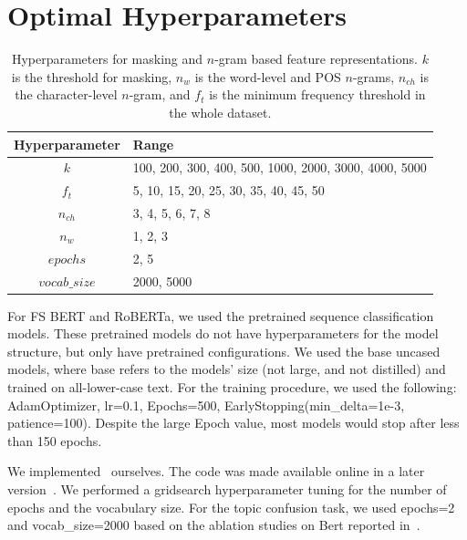 \documentclass[11pt]{article}
\begin{document}
\newpage
\section{Optimal Hyperparameters\label{appOptimal}}
\begin{table}[htbp]
\centering
\begin{tabular}{c|l }
\hline
\textbf{Hyperparameter}  &  \textbf{Range}  \\ \hline
$k$ & 100, 200, 300, 400, 500, 1000, 2000, 3000, 4000, 5000 \\
$f_{t} $ & 5, 10, 15, 20, 25, 30, 35, 40, 45, 50 \\
$n_{ch}$ & 3, 4, 5, 6, 7, 8 \\
$n_{w}$ & 1, 2, 3 \\
$epochs$ & 2, 5 \\
$vocab\_size$ & 2000, 5000 \\
\hline
\end{tabular}
\caption{\label{hypers}
Hyperparameters for masking and $n$-gram based feature representations. $k$ is the threshold for masking, $n_{w}$ is the word-level and POS $n$-grams, $n_{ch}$ is the character-level $n$-gram, and $f_{t}$ is the minimum frequency threshold in the whole dataset.}
\end{table}

For FS BERT and RoBERTa, we used the pretrained sequence classification models. These pretrained models do not have hyperparameters for the model structure, but only have pretrained configurations. We used the base uncased models, where base refers to the models' size (not large, and not distilled) and trained on all-lower-case text. For the training procedure, we used the following: AdamOptimizer, lr=0.1, Epochs=500, EarlyStopping(min\_delta=1e-3, patience=100). Despite the large Epoch value, most models would stop after less than 150 epochs.

We implemented~\citet{Barlas2020} ourselves. The code was made available online in a later version~\citet{Barlas2021}. We performed a gridsearch hyperparameter tuning for the number of epochs and the vocabulary size. For the topic confusion task, we used epochs=2 and vocab\_size=2000 based on the ablation studies on Bert reported in~\citet{Barlas2020}. 
\end{document}
